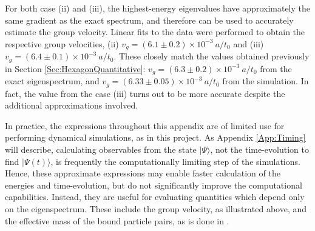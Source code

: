 For both case (ii) and (iii), the highest-energy eigenvalues have approximately the same gradient as the exact spectrum, and therefore can be used to accurately estimate the group velocity. Linear fits to the data were performed to obtain the respective group velocities, (ii) $v_g=(6.1\pm 0.2)\times 10^{-3}\:a/t_0$ and (iii) $v_g=(6.4\pm 0.1)\times 10^{-3}\:a/t_0$. These closely match the values obtained previously in Section \ref{Sec:HexagonQuantitative}: $v_g=(6.3 \pm 0.2)\times 10^{-3}\: a/t_0$ from the exact eigenspectrum, and $v_g=(6.33 \pm 0.05)\times 10^{-3} \: a/t_0$ from the simulation. In fact, the value from the case (iii) turns out to be more accurate despite the additional approximations involved.

In practice, the expressions throughout this appendix are of limited use for performing dynamical simulations, as in this project. As Appendix \ref{App:Timing} will describe, calculating observables from the state $|\Psi\rangle$, not the time-evolution to find $|\Psi(t)\rangle$, is frequently the computationally limiting step of the simulations. Hence, these approximate expressions may enable faster calculation of the energies and time-evolution, but do not significantly improve the computational capabilities. Instead, they are useful for evaluating quantities which depend only on the eigenspectrum. These include the group velocity, as illustrated above, and the effective mass of the bound particle pairs, as is done in \cite{Torma}.
